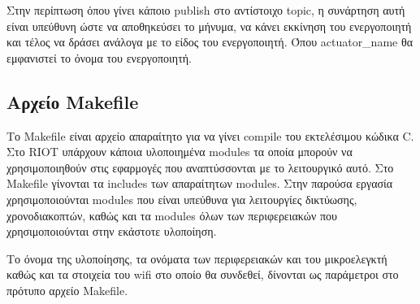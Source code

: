 Στην περίπτωση όπου γίνει κάποιο publish στο αντίστοιχο topic, η συνάρτηση αυτή είναι υπεύθυνη ώστε να αποθηκεύσει το μήνυμα, να κάνει εκκίνηση του ενεργοποιητή και τέλος να δράσει ανάλογα με το είδος του ενεργοποιητή. Όπου actuator\_name θα εμφανιστεί το όνομα του ενεργοποιητή.

\subsection{Αρχείο Makefile}
\label{subsec:makefile}

Το Makefile είναι αρχείο απαραίτητο για να γίνει compile του εκτελέσιμου κώδικα C. Στο RIOT υπάρχουν κάποια υλοποιημένα modules τα οποία μπορούν να χρησιμοποιηθούν στις εφαρμογές που αναπτύσσονται με το λειτουργικό αυτό. Στο Makefile γίνονται τα includes των απαραίτητων modules. Στην παρούσα εργασία χρησιμοποιούνται modules που είναι υπεύθυνα για λειτουργίες δικτύωσης, χρονοδιακοπτών, καθώς και τα modules όλων των περιφερειακών που χρησιμοποιούνται στην εκάστοτε υλοποίηση.

Το όνομα της υλοποίησης, τα ονόματα των περιφερειακών και του μικροελεγκτή καθώς και τα στοιχεία του wifi στο οποίο θα συνδεθεί, δίνονται ως παράμετροι στο πρότυπο αρχείο Makefile.